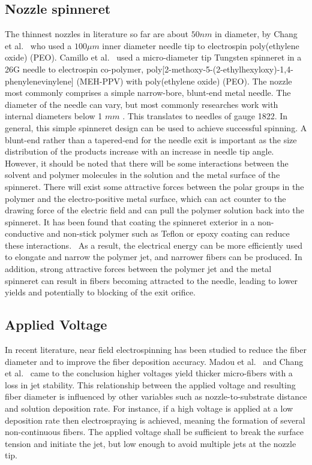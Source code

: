\subsection{Nozzle spinneret}The thinnest nozzles in literature so far are about $50 nm $ in diameter, by Chang et al.\unskip~\cite{527120:11974306} who used a  $100 \mu m $ inner diameter needle tip to electrospin poly(ethylene oxide) (PEO). Camillo et al.\unskip~\cite{527120:12322072} used a micro-diameter tip Tungsten spinneret in a 26G needle to electrospin co-polymer, poly[2-methoxy-5-(2-ethylhexyloxy)-1,4-phenylenevinylene] (MEH-PPV) with poly(ethylene oxide) (PEO). The nozzle most commonly comprises a simple narrow-bore, blunt-end metal needle. The diameter of the needle can vary, but most commonly researches work with internal diameters below 1 $mm $ . This translates to needles of gauge 18{\textendash}22. In general, this simple spinneret design can be used to achieve successful spinning. A blunt-end rather than a tapered-end for the needle exit is important as the size distribution of the products increase with an increase in needle tip angle. However, it should be noted that there will be some interactions between the solvent and polymer molecules in the solution and the metal surface of the spinneret. There will exist some attractive forces between the polar groups in the polymer and the electro-positive metal surface, which can act counter to the drawing force of the electric field and can pull the polymer solution back into the spinneret. It has been found that coating the spinneret exterior in a non-conductive and non-stick polymer such as Teflon or epoxy coating can reduce these interactions.\unskip~\cite{527120:13082768,527120:13082811} As a result, the electrical energy can be more efficiently used to elongate and narrow the polymer jet, and narrower fibers can be produced. In addition, strong attractive forces between the polymer jet and the metal spinneret can result in fibers becoming attracted to the needle, leading to lower yields and potentially to blocking of the exit orifice.



\subsection{Applied Voltage}In recent literature, near field electrospinning has been studied to reduce the fiber diameter and to improve the fiber deposition accuracy. Madou et al.\unskip~\cite{527120:11973130} and Chang et al.\unskip~\cite{527120:11974306} came to the conclusion higher voltages yield thicker micro-fibers with a loss in jet stability. This relationship between the applied voltage and resulting fiber diameter is influenced by other variables such as nozzle-to-substrate distance and solution deposition rate. For instance, if a high voltage is applied at a low deposition rate then electrospraying is achieved, meaning the formation of several non-continuous fibers. The applied voltage shall be sufficient to break the surface tension and initiate the jet, but low enough to avoid multiple jets at the nozzle tip.


